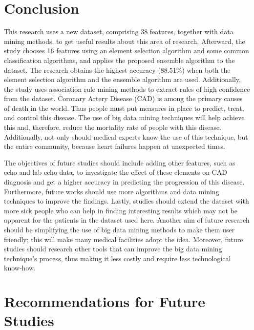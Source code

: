 \section{Conclusion}
This research uses a new dataset, comprising 38 features, together
with data mining methods, to get useful results about this  area of
research. Afterward, the study chooses 16 features using an element 
selection algorithm and some common classification algorithms, and
applies the proposed ensemble algorithm to the dataset. 
The research obtains the highest accuracy (88.51\%) when both the
element selection algorithm and the ensemble algorithm are  used.
Additionally, the study uses association rule mining methods to
extract rules of high confidence from the dataset. 
Coronary Artery Disease (CAD) is among the primary causes of death in
the world. 
Thus people must put measures in place to predict, treat, and control
this disease. 
The use of big data mining techniques will help achieve this and,
therefore, reduce the  mortality rate of people with this disease.
Additionally, not only should medical experts know the use of this
technique, but the  entire community, because heart failures happen at
unexpected times. 
\par The objectives of future studies should include adding other
features, such as echo and lab echo data, to investigate the effect of
these elements on CAD diagnosis and get a higher accuracy in
predicting the progression of this disease. Furthermore, future works
should use more algorithms and data mining techniques to improve the
findings. Lastly, studies should extend the dataset with more sick
people who can help in finding interesting results which may not be
apparent for the patients in the dataset used here. Another aim of
future research should be simplifying the use of big data mining
methods to make them user friendly; this will make many medical
facilities adopt the idea. Moreover, future studies should research
other tools that can improve the big data mining technique's process,
thus making it less costly and require less technological know-how.

\section{Recommendations for Future Studies}

